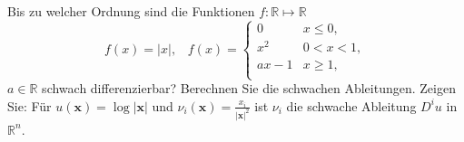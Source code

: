 Bis zu welcher Ordnung sind die Funktionen $f: \mathbb{R} \mapsto \mathbb{R}$
\begin{equation*}
    f(x) = |x|, \hspace{10pt} f(x) = 
    \begin{cases}
    0 & x \leq 0, \\
    x^2 & 0 < x < 1, \\
    ax - 1 & x \geq 1, \\
    \end{cases}
\end{equation*}
$a \in \mathbb{R}$ schwach differenzierbar? Berechnen Sie die schwachen Ableitungen.
Zeigen Sie: Für $u(\textbf{x}) = \log|\textbf{x}|$ und $\nu_i(\textbf{x}) = \frac{x_i}{|\textbf{x}|^2}$ ist $\nu_i$ die schwache Ableitung $D^iu$ in $\mathbb{R}^n$.
 
